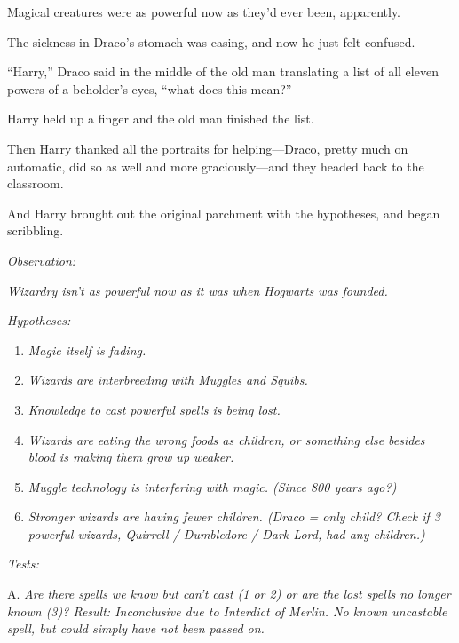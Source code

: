 Magical creatures were as powerful now as they'd ever been, apparently.

The sickness in Draco's stomach was easing, and now he just felt
confused.

``Harry,'' Draco said in the middle of the old man translating a list of
all eleven powers of a beholder's eyes, ``what does this mean?''

Harry held up a finger and the old man finished the list.

Then Harry thanked all the portraits for helping---Draco, pretty much on
automatic, did so as well and more graciously---and they headed back to
the classroom.

And Harry brought out the original parchment with the hypotheses, and
began scribbling.

\emph{Observation:}

\emph{Wizardry isn't as powerful now as it was when Hogwarts was
founded.}

\emph{Hypotheses:}

\begin{enumerate}
\def\labelenumi{\arabic{enumi}.}
\itemsep1pt\parskip0pt
\item
  \emph{Magic itself is fading.}\\
\item
  \emph{Wizards are interbreeding with Muggles and Squibs.}\\
\item
  \emph{Knowledge to cast powerful spells is being lost.}\\
\item
  \emph{Wizards are eating the wrong foods as children, or something
  else besides blood is making them grow up weaker.}\\
\item
  \emph{Muggle technology is interfering with magic. (Since 800 years
  ago?)}\\
\item
  \emph{Stronger wizards are having fewer children. (Draco = only child?
  Check if 3 powerful wizards, Quirrell / Dumbledore / Dark Lord, had
  any children.)}
\end{enumerate}

\emph{Tests:}

A. \emph{Are there spells we know but can't cast (1 or 2) or are the
lost spells no longer known (3)? Result: Inconclusive due to Interdict
of Merlin. No known uncastable spell, but could simply have not been
passed on.}

